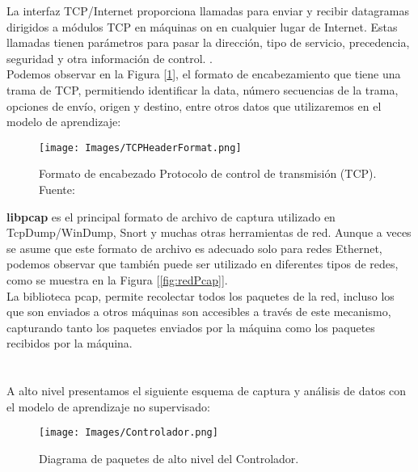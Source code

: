 La interfaz TCP/Internet proporciona llamadas para enviar y recibir datagramas dirigidos a módulos TCP en máquinas on en cualquier lugar de Internet. Estas llamadas tienen parámetros para pasar la dirección, tipo de servicio, precedencia, seguridad y otra información de control. \cite{noauthor_rfc_nodate}.\\


Podemos observar en la Figura [\ref{fig:TCPHeaderFormat}], el formato de encabezamiento que tiene una trama de TCP, permitiendo identificar la data, número secuencias de la trama, opciones de envío, origen y destino, entre otros datos que utilizaremos en el modelo de aprendizaje:

\begin{figure}[H]
    \centering
    \texttt{[image: Images/TCPHeaderFormat.png]}
    \caption{Formato de encabezado Protocolo de control de transmisión (TCP).
    Fuente: \cite{noauthor_rfc_nodate}}
    \label{fig:TCPHeaderFormat}
\end{figure}



\textbf{libpcap} es el principal formato de archivo de captura utilizado en TcpDump/WinDump, Snort y muchas otras herramientas de red. Aunque a veces se asume que este formato de archivo es adecuado solo para redes Ethernet, podemos observar que también puede ser utilizado en diferentes tipos de redes, como se muestra en la Figura [\ref{fig:redPcap}].\\

La biblioteca pcap, permite recolectar todos los paquetes de la red, incluso los que son enviados a otros máquinas son accesibles a través de este mecanismo, capturando tanto los paquetes enviados por la máquina como los paquetes recibidos por la máquina.\\
\\
\\
A alto nivel presentamos el siguiente esquema de captura y análisis de datos con el modelo de aprendizaje no supervisado:

\begin{figure}[H]
    \centering
    \texttt{[image: Images/Controlador.png]}
    \caption{Diagrama de paquetes de alto nivel del Controlador.}
    \label{fig:diagramaPaquetesControlador}
\end{figure}

